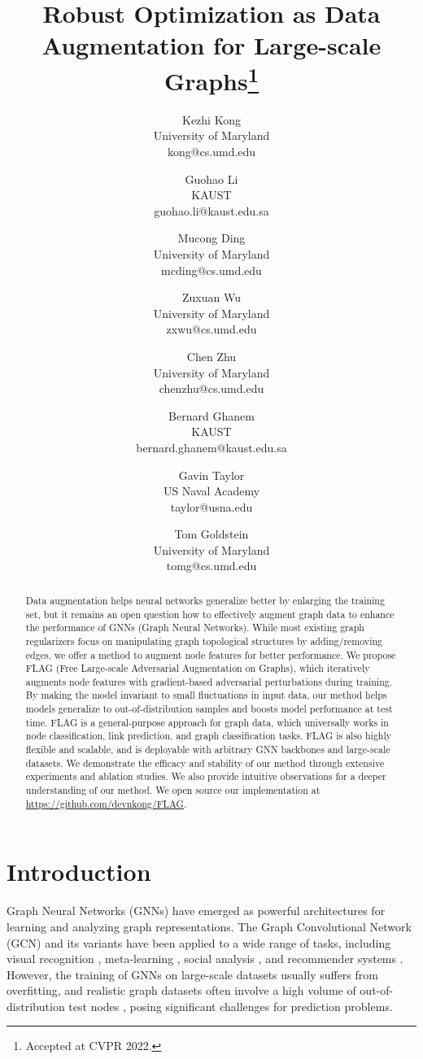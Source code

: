 \documentclass[11pt]{article}
\title{Robust Optimization as Data Augmentation for Large-scale Graphs\footnote{Accepted at CVPR 2022.}}
\author{
Kezhi Kong \\ University of Maryland \\ \small{kong@cs.umd.edu} \and
Guohao Li \\ KAUST \\ \small{guohao.li@kaust.edu.sa} \and
Mucong Ding \\ University of Maryland \\ \small{mcding@cs.umd.edu} \and
Zuxuan Wu \\ University of Maryland \\ \small{zxwu@cs.umd.edu} \and
Chen Zhu \\ University of Maryland \\ \small{chenzhu@cs.umd.edu}  \and
Bernard Ghanem \\ KAUST \\ \small{bernard.ghanem@kaust.edu.sa} \and 
Gavin Taylor \\ US Naval Academy \\ \small{taylor@usna.edu} \and 
Tom Goldstein \\  University of Maryland \\ \small{tomg@cs.umd.edu}
}
\date{}
\begin{document}
\maketitle

\begin{abstract}
Data augmentation helps neural networks generalize better by enlarging the training set, but it remains an open question how to effectively augment graph data to enhance the performance of GNNs (Graph Neural Networks). While most existing graph regularizers focus on manipulating graph topological structures by adding/removing edges, we offer a method to augment node features for better performance. We propose FLAG (Free Large-scale Adversarial Augmentation on Graphs), which iteratively augments node features with gradient-based adversarial perturbations during training. By making the model invariant to small fluctuations in input data, our method helps models generalize to out-of-distribution samples and boosts model performance at test time. FLAG is a general-purpose approach for graph data, which universally works in node classification, link prediction, and graph classification tasks. FLAG is also highly flexible and scalable, and is deployable with arbitrary GNN backbones and large-scale datasets. We demonstrate the efficacy and stability of our method through extensive experiments and ablation studies. We also provide intuitive observations for a deeper understanding of our method. We open source our implementation at \url{https://github.com/devnkong/FLAG}.
\end{abstract}

\section{Introduction}



Graph Neural Networks (GNNs) have emerged as powerful architectures for learning and analyzing graph representations. The Graph Convolutional Network (GCN) \citep{kipf2016semi} and its variants have been applied to a wide range of tasks, including visual recognition \citep{shen2018person}, meta-learning \citep{garcia2017few}, social analysis \citep{qiu2018deepinf,li2019encoding}, and recommender systems \citep{ying2018graph}. However, the training of GNNs on large-scale datasets usually suffers from overfitting, and realistic graph datasets often involve a high volume of out-of-distribution test nodes \citep{hu2020open}, posing significant challenges for prediction problems. 
\end{document}
